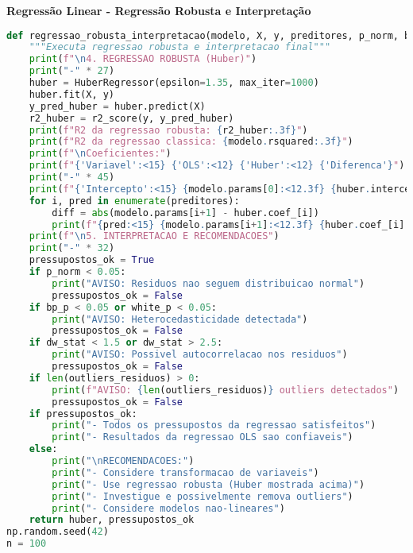 \begin{examplebox}
\textbf{Regressão Linear - Regressão Robusta e Interpretação}

\begin{lstlisting}[language=Python]
def regressao_robusta_interpretacao(modelo, X, y, preditores, p_norm, bp_p, white_p, dw_stat, outliers_residuos):
    """Executa regressao robusta e interpretacao final"""
    print(f"\n4. REGRESSAO ROBUSTA (Huber)")
    print("-" * 27)
    huber = HuberRegressor(epsilon=1.35, max_iter=1000)
    huber.fit(X, y)
    y_pred_huber = huber.predict(X)
    r2_huber = r2_score(y, y_pred_huber)
    print(f"R2 da regressao robusta: {r2_huber:.3f}")
    print(f"R2 da regressao classica: {modelo.rsquared:.3f}")
    print(f"\nCoeficientes:")
    print(f"{'Variavel':<15} {'OLS':<12} {'Huber':<12} {'Diferenca'}")
    print("-" * 45)
    print(f"{'Intercepto':<15} {modelo.params[0]:<12.3f} {huber.intercept_:<12.3f} {abs(modelo.params[0] - huber.intercept_):<12.3f}")
    for i, pred in enumerate(preditores):
        diff = abs(modelo.params[i+1] - huber.coef_[i])
        print(f"{pred:<15} {modelo.params[i+1]:<12.3f} {huber.coef_[i]:<12.3f} {diff:<12.3f}")
    print(f"\n5. INTERPRETACAO E RECOMENDACOES")
    print("-" * 32)
    pressupostos_ok = True
    if p_norm < 0.05:
        print("AVISO: Residuos nao seguem distribuicao normal")
        pressupostos_ok = False
    if bp_p < 0.05 or white_p < 0.05:
        print("AVISO: Heterocedasticidade detectada")
        pressupostos_ok = False
    if dw_stat < 1.5 or dw_stat > 2.5:
        print("AVISO: Possivel autocorrelacao nos residuos")
        pressupostos_ok = False
    if len(outliers_residuos) > 0:
        print(f"AVISO: {len(outliers_residuos)} outliers detectados")
        pressupostos_ok = False
    if pressupostos_ok:
        print("- Todos os pressupostos da regressao satisfeitos")
        print("- Resultados da regressao OLS sao confiaveis")
    else:
        print("\nRECOMENDACOES:")
        print("- Considere transformacao de variaveis")
        print("- Use regressao robusta (Huber mostrada acima)")
        print("- Investigue e possivelmente remova outliers")
        print("- Considere modelos nao-lineares")
    return huber, pressupostos_ok
np.random.seed(42)
n = 100
\end{lstlisting}
\end{examplebox}


